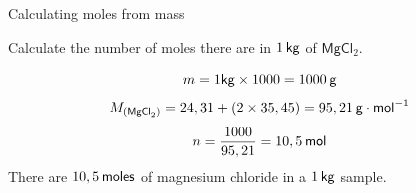     \noindent
  \vspace{-.3cm}
\par
            \label{m38717*secfhsst!!!underscore!!!id641}\vspace{.5cm}  
      \begin{wex}{Calculating moles from mass }
{
      \label{m38717*id278755}Calculate the number of moles there are in $1\phantom{\rule{2pt}{0ex}}\mathsf{kg}$ of $\mathsf{MgCl}{}_{2}$.\par 
      \vspace{5pt}}
{


\label{m38717*id278854}\nopagebreak\noindent{}
    \begin{equation}
    m=1\mathsf{kg}\ensuremath{\times}1 000=1 000\phantom{\rule{2pt}{0ex}}\mathsf{g}
      \end{equation}
\label{m38717*id278912}\nopagebreak\noindent{}
    \begin{equation}
    {M}_{\left({\mathsf{MgCl}}_{2}\right)}=24,31+\left(2\ensuremath{\times}35,45\right)=95,21\phantom{\rule{2pt}{0ex}}\mathsf{g}\ensuremath{\cdot}{\mathsf{mol}}^{-1}
      \end{equation}    
      \label{m38717*id279005}\nopagebreak\noindent{}
    \begin{equation}
    n=\frac{1000}{95,21}=10,5\phantom{\rule{2pt}{0ex}}\mathsf{mol}
      \end{equation}
      \label{m38717*id279046}There are $10,5\phantom{\rule{2pt}{0ex}}\mathsf{moles}$ of magnesium chloride in a $1\phantom{\rule{2pt}{0ex}}\mathsf{kg}$ sample.\par 
}
    \end{wex}
    \noindent
\label{m38717*secfhsst!!!underscore!!!id695}\vspace{.5cm} 
